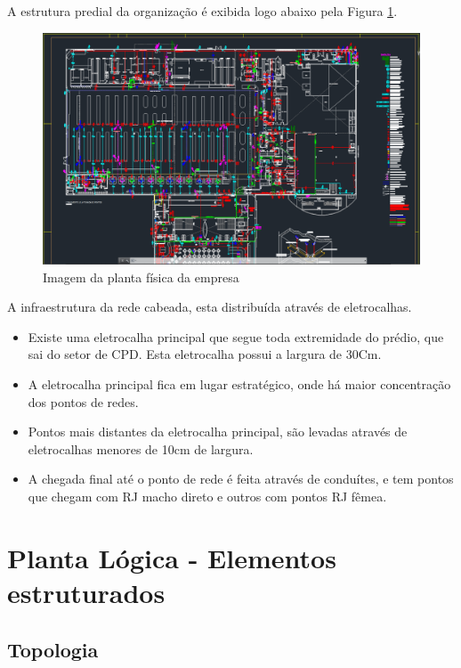 \documentclass[	DIV=calc,%
							paper=a4,%
							fontsize=12pt,%
							onecolumn]{scrartcl}	 					%
\begin{document}
A estrutura predial da organização é exibida logo abaixo pela Figura \ref{Fig_estrutura_predial}.

\begin{figure}[h!]
	\centering
	\includegraphics[width=\textwidth]{Fig_estrutura_predial}
	\caption{Imagem da planta física da empresa}
	\label{Fig_estrutura_predial}
\end{figure}

A infraestrutura da rede cabeada, esta distribuída através de eletrocalhas.  

\begin{itemize}
	
	\item Existe uma eletrocalha principal que segue toda extremidade do prédio, que sai do setor de CPD. Esta eletrocalha possui a largura de 30Cm.
	\item A eletrocalha  principal fica em lugar estratégico, onde há maior concentração dos pontos de redes.
	\item Pontos mais distantes da eletrocalha principal, são levadas através de eletrocalhas menores de 10cm de largura.
	\item A chegada final até o ponto de rede é feita através de conduítes, e tem pontos que chegam com RJ macho direto e outros com pontos RJ fêmea.

\end{itemize}

\section{Planta Lógica - Elementos estruturados}


\subsection{Topologia}
\end{document}
